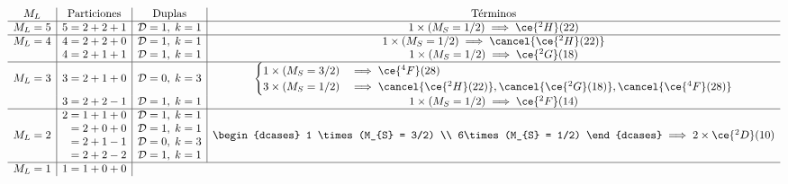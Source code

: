 \begin{figure}[H] 
  \begin{center}
\begin{align*}
 \begin{array}{c | c | c | c}
   M_{L} & \text{ Particiones } & \text{ Duplas } & \text{ Términos }\\
   \hline
   M_{L}= 5  & 5 = 2 + 2 + 1  &  \mathcal{D} = 1,\; k = 1 & 1 \times (M_{S} = 1/2) \implies \ce{^{2}H}(22)\\
   \hline
   M_{L} = 4 & 4 = 2 + 2 + 0 & \mathcal{D} = 1,\; k = 1 & 1 \times (M_{S} = 1/2) \implies \cancel{\ce{^{2}H}(22)}\\ 
             & 4 = 2 + 1 + 1 & \mathcal{D} = 1,\; k = 1 & 1 \times (M_{S} = 1/2) \implies \ce{^{2}G}(18)\\
  \hline
   M_{L} = 3 & 3 = 2 + 1 + 0 & \mathcal{D} = 0, \; k = 3 & \begin{cases}
   1 \times (M_{S} = 3/2) &\implies \ce{^{4}F}(28)\\
   3 \times (M_{S} = 1/2) & \implies \cancel{\ce{^{2}H}(22)}, \cancel{\ce{^{2}G}(18)}, \cancel{\ce{^{4}F}(28)}
   \end{cases}\\ 
             & 3 = 2 + 2 -1 & \mathcal{D} = 1, \; k = 1 & 1 \times (M_{S} = 1/2) \implies \ce{^{2}F}(14)\\
  \hline
     M_{L} = 2 & 
     \begin{aligned}
       2 &= 1 + 1 + 0\\ 
         &= 2 + 0 + 0\\ 
         &= 2 + 1 - 1\\ 
         &= 2 + 2 - 2
     \end{aligned} 
     & \begin{aligned}
       \mathcal{D} &= 1,\;  k = 1\\ 
       \mathcal{D} &= 1,\;  k = 1\\ 
       \mathcal{D} &= 0,\;  k = 3\\ 
       \mathcal{D} &= 1,\;  k = 1\\ 
     \end{aligned} & \begin{dcases}
      1 \times (M_{S} = 3/2) \\
      6\times (M_{S} = 1/2) 
     \end{dcases}  \implies 2 \times \ce{^{2}D}(10) \\ 
     \hline
     M_{L} = 1 & 
     \begin{aligned}
     1 &= 1 + 0 + 0\\ 

\end{aligned}
\end{array}
\end{align*}
\end{center}
\end{figure}
